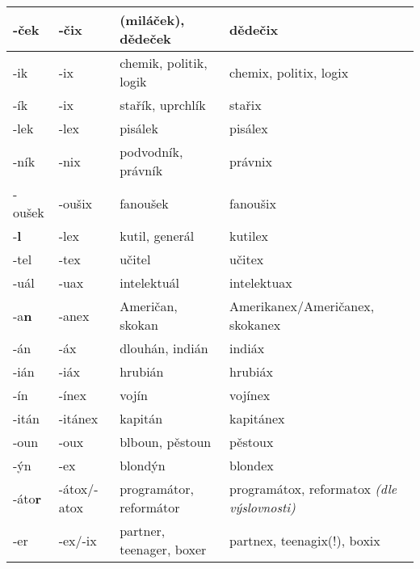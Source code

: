 \begin{table}
{\begin{longtabu}{|X[1,R]|X[1,R]|X[3,L]|X[3,L]|}
-ček            &-čix   &{\small(miláček),} dědeček & dědečix\\\hline%
-ik             &-ix    &chemik, politik, logik&chemix, politix, logix\\\hline%
-ík             &-ix    &stařík, uprchlík   &stařix\\\hline%
-lek            &-lex   &pisálek            &pisálex\\\hline%
-ník            &-nix   &podvodník, právník &právnix\\\hline%
-oušek          &-oušix &fanoušek           &fanoušix\\\hline%
%
-\textbf{l}     &-lex   &kutil, generál     &kutilex\\\hline%
-tel            &-tex   &učitel             &učitex\\\hline%
-uál            &-uax   &intelektuál        &intelektuax\\\hline%
%
-a\textbf{n}    &-anex  &Američan, skokan   &Amerikanex/Američanex, skokanex\\\hline%
-án             &-áx    &dlouhán, indián    &indiáx\\\hline%
-ián            &-iáx   &hrubián            &hrubiáx\\\hline%
-ín             &-ínex  &vojín              &vojínex\\\hline%
-itán           &-itánex &kapitán           &kapitánex\\\hline%
-oun            &-oux   &blboun, pěstoun    &pěstoux\\\hline%
-ýn             &-ex    &blondýn            &blondex\\\hline%
%
-áto\textbf{r}  &-átox/-atox&programátor, reformátor&programátox, reformatox {\footnotesize\emph{(dle výslovnosti)}}\\\hline%
-er             &-ex/-ix&partner, teenager, boxer&partnex, teenagix(!), boxix\\\hline%

\end{longtabu}}
\end{table}
